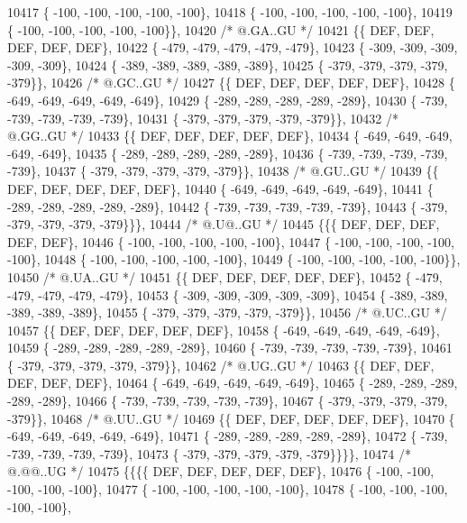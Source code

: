 \begin{DoxyCode}
10417 \{ -100, -100, -100, -100, -100\},
10418 \{ -100, -100, -100, -100, -100\},
10419 \{ -100, -100, -100, -100, -100\}\},
10420 \textcolor{comment}{/*  @.GA..GU */}
10421 \{\{  DEF,  DEF,  DEF,  DEF,  DEF\},
10422 \{ -479, -479, -479, -479, -479\},
10423 \{ -309, -309, -309, -309, -309\},
10424 \{ -389, -389, -389, -389, -389\},
10425 \{ -379, -379, -379, -379, -379\}\},
10426 \textcolor{comment}{/*  @.GC..GU */}
10427 \{\{  DEF,  DEF,  DEF,  DEF,  DEF\},
10428 \{ -649, -649, -649, -649, -649\},
10429 \{ -289, -289, -289, -289, -289\},
10430 \{ -739, -739, -739, -739, -739\},
10431 \{ -379, -379, -379, -379, -379\}\},
10432 \textcolor{comment}{/*  @.GG..GU */}
10433 \{\{  DEF,  DEF,  DEF,  DEF,  DEF\},
10434 \{ -649, -649, -649, -649, -649\},
10435 \{ -289, -289, -289, -289, -289\},
10436 \{ -739, -739, -739, -739, -739\},
10437 \{ -379, -379, -379, -379, -379\}\},
10438 \textcolor{comment}{/*  @.GU..GU */}
10439 \{\{  DEF,  DEF,  DEF,  DEF,  DEF\},
10440 \{ -649, -649, -649, -649, -649\},
10441 \{ -289, -289, -289, -289, -289\},
10442 \{ -739, -739, -739, -739, -739\},
10443 \{ -379, -379, -379, -379, -379\}\}\},
10444 \textcolor{comment}{/*  @.U@..GU */}
10445 \{\{\{  DEF,  DEF,  DEF,  DEF,  DEF\},
10446 \{ -100, -100, -100, -100, -100\},
10447 \{ -100, -100, -100, -100, -100\},
10448 \{ -100, -100, -100, -100, -100\},
10449 \{ -100, -100, -100, -100, -100\}\},
10450 \textcolor{comment}{/*  @.UA..GU */}
10451 \{\{  DEF,  DEF,  DEF,  DEF,  DEF\},
10452 \{ -479, -479, -479, -479, -479\},
10453 \{ -309, -309, -309, -309, -309\},
10454 \{ -389, -389, -389, -389, -389\},
10455 \{ -379, -379, -379, -379, -379\}\},
10456 \textcolor{comment}{/*  @.UC..GU */}
10457 \{\{  DEF,  DEF,  DEF,  DEF,  DEF\},
10458 \{ -649, -649, -649, -649, -649\},
10459 \{ -289, -289, -289, -289, -289\},
10460 \{ -739, -739, -739, -739, -739\},
10461 \{ -379, -379, -379, -379, -379\}\},
10462 \textcolor{comment}{/*  @.UG..GU */}
10463 \{\{  DEF,  DEF,  DEF,  DEF,  DEF\},
10464 \{ -649, -649, -649, -649, -649\},
10465 \{ -289, -289, -289, -289, -289\},
10466 \{ -739, -739, -739, -739, -739\},
10467 \{ -379, -379, -379, -379, -379\}\},
10468 \textcolor{comment}{/*  @.UU..GU */}
10469 \{\{  DEF,  DEF,  DEF,  DEF,  DEF\},
10470 \{ -649, -649, -649, -649, -649\},
10471 \{ -289, -289, -289, -289, -289\},
10472 \{ -739, -739, -739, -739, -739\},
10473 \{ -379, -379, -379, -379, -379\}\}\}\},
10474 \textcolor{comment}{/*  @.@@..UG */}
10475 \{\{\{\{  DEF,  DEF,  DEF,  DEF,  DEF\},
10476 \{ -100, -100, -100, -100, -100\},
10477 \{ -100, -100, -100, -100, -100\},
10478 \{ -100, -100, -100, -100, -100\},

\end{DoxyCode}
